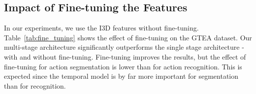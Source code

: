 \documentclass[10pt,twocolumn,letterpaper]{article}
\begin{document}
\subsection{Impact of Fine-tuning the Features}
In our experiments, we use the I3D features without fine-tuning. Table~\ref{tab:fine_tuning} 
shows the effect of fine-tuning on the GTEA dataset. Our multi-stage architecture 
significantly outperforms the single stage architecture - with and without fine-tuning. 
Fine-tuning improves the results, but the effect of fine-tuning for action segmentation is 
lower than for action recognition. This is expected since the temporal model is by far 
more important for segmentation than for recognition.

\begin{table}[ht]
\centering
{}
\caption{Effect of fine-tuning on the GTEA dataset.}
\label{tab:fine_tuning}
\end{table}
%
\end{document}
